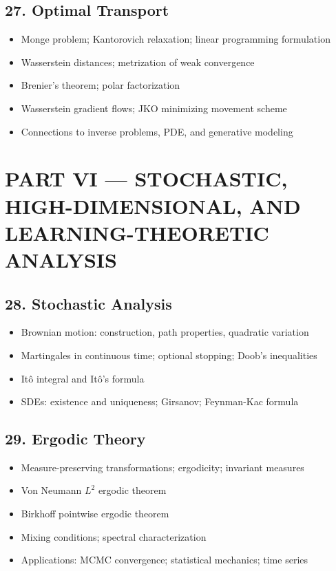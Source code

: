 \subsection{27. Optimal Transport}
\begin{itemize}
\item Monge problem; Kantorovich relaxation; linear programming formulation
\item Wasserstein distances; metrization of weak convergence
\item Brenier's theorem; polar factorization
\item Wasserstein gradient flows; JKO minimizing movement scheme
\item Connections to inverse problems, PDE, and generative modeling
\end{itemize}

\section{PART VI --- STOCHASTIC, HIGH-DIMENSIONAL, AND LEARNING-THEORETIC ANALYSIS}

\subsection{28. Stochastic Analysis}
\begin{itemize}
\item Brownian motion: construction, path properties, quadratic variation
\item Martingales in continuous time; optional stopping; Doob's inequalities
\item It\^o integral and It\^o's formula
\item SDEs: existence and uniqueness; Girsanov; Feynman-Kac formula
\end{itemize}

\subsection{29. Ergodic Theory}
\begin{itemize}
\item Measure-preserving transformations; ergodicity; invariant measures
\item Von Neumann $L^2$ ergodic theorem
\item Birkhoff pointwise ergodic theorem
\item Mixing conditions; spectral characterization
\item Applications: MCMC convergence; statistical mechanics; time series
\end{itemize}

